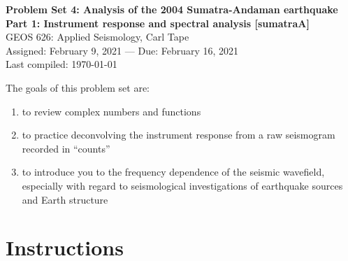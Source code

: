 \documentclass[11pt,titlepage,fleqn]{article}
\begin{document}

\begin{spacing}{1.2}
\centering
{\large \bf Problem Set 4: Analysis of the 2004 Sumatra-Andaman earthquake \\
Part 1: Instrument response and spectral analysis [sumatraA] \\ }
GEOS 626: Applied Seismology, Carl Tape \\
Assigned: February 9, 2021 --- Due: February 16, 2021 \\
Last compiled: \today
\end{spacing}


\bigskip
\noindent
The goals of this problem set are:
%
\begin{enumerate}
\item to review complex numbers and functions
\item to practice deconvolving the instrument response from a raw seismogram recorded in ``counts''
\item to introduce you to the frequency dependence of the seismic wavefield, especially with regard to seismological investigations of earthquake sources and Earth structure
\end{enumerate}

\section*{Instructions}
\end{document}
